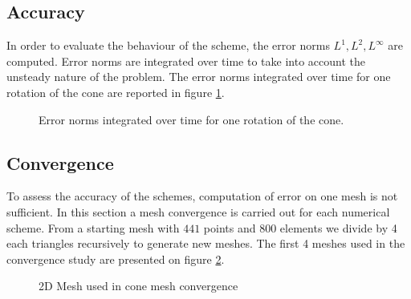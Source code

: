 \subsection{Accuracy}

In order to evaluate the behaviour of the scheme, the error norms $L^1, L^2, L^{\infty}$ are computed.
Error norms are integrated over time to take into account the unsteady nature of the problem.
The error norms integrated over time for one rotation of the cone are reported in figure \ref{t2d:cone:error_timeintegrals}.

\begin{figure}[H]
\centering
{}
\caption{Error norms integrated over time for one rotation of the cone.}
\label{t2d:cone:error_timeintegrals}
\end{figure}

\newpage
\subsection{Convergence}
To assess the accuracy of the schemes, computation of error on one mesh is not sufficient.
In this section a mesh convergence is carried out for each numerical scheme. From a starting mesh
with $441$ points and $800$ elements we divide by 4 each triangles recursively to generate new meshes.
The first 4 meshes used in the convergence study are presented on figure \ref{t2d:cone:meshes}.

\begin{figure}[h!]
\begin{minipage}[t]{0.5\textwidth}
 \centering
\end{minipage}%
\begin{minipage}[t]{0.5\textwidth}
 \centering
\end{minipage}
\begin{minipage}[t]{0.5\textwidth}
 \centering
\end{minipage}%
\begin{minipage}[t]{0.5\textwidth}
 \centering
\end{minipage}
 \caption{2D Mesh used in cone mesh convergence}
 \label{t2d:cone:meshes}
\end{figure}


